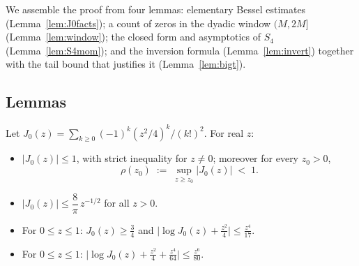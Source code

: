 We assemble the proof from four lemmas: elementary Bessel estimates
(Lemma~\ref{lem:J0facts}); a count of zeros in the dyadic window
$(M,2M]$ (Lemma~\ref{lem:window}); the closed form and asymptotics of
$S_4$ (Lemma~\ref{lem:S4mom}); and the inversion formula
(Lemma~\ref{lem:invert}) together with the tail bound that justifies
it (Lemma~\ref{lem:bigt}).

\subsection*{Lemmas}

\begin{lemma}\label{lem:J0facts}
Let $J_0(z)=\sum_{k\ge0}(-1)^k(z^2/4)^k/(k!)^2$. For real $z$:
\begin{itemize}
\item[(J1)] $|J_0(z)|\le1$, with strict inequality for $z\ne0$;
moreover for every $z_0>0$,
\[
\rho(z_0)\;:=\;\sup_{z\ge z_0}|J_0(z)|\;<\;1 .
\]
\item[(J2)] $|J_0(z)|\le\dfrac{8}{\pi}\,z^{-1/2}$ for all $z>0$.
\item[(J3)] For $0\le z\le1$: $J_0(z)\ge\tfrac34$ and
$\bigl|\log J_0(z)+\tfrac{z^2}4\bigr|\le\tfrac{z^4}{17}$.
\item[(J4)] For $0\le z\le1$:
$\bigl|\log J_0(z)+\tfrac{z^2}4+\tfrac{z^4}{64}\bigr|
\le\tfrac{z^6}{80}$.
\end{itemize}
\end{lemma}

